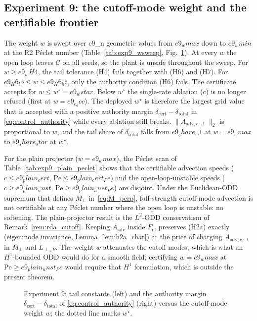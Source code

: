

\subsection{Experiment 9: the cutoff-mode weight and the certifiable frontier}
The weight \(w\) is swept over {{e9_n}} geometric values from \({{e9_wmax}}\) down to \({{e9_wmin}}\) at the R2 P\'eclet number
(Table~\ref{tab:exp9_wsweep}, Fig.~\ref{fig:exp9}). At every \(w\) the open loop leaves \(\mathcal C\) on all seeds, so
the plant is unsafe throughout the sweep. For \(w \ge {{e9_wH4}}\), the tail tolerance (H4) fails together with (H6) and
(H7). For \({{e9_H6_lo}} \le w \le {{e9_H6_hi}}\), only the authority condition (H6) fails. The certificate accepts
for \(w \le w^\star = {{e9_wstar}}\). Below \(w^\star\) the single-rate ablation (c) is no longer refused (first at
\(w = {{e9_c_acc}}\)). The deployed \(w^\star\) is therefore the largest grid value that is accepted with a positive
authority margin \(\delta_{\mathrm{cert}}-\delta_{\mathrm{total}}\) in \eqref{eq:control_authority} while every ablation still breaks. \(\|A_{\mathrm{adv},r,\perp}\|_2\) is proportional to
\(w\), and the tail share of \(\delta_{\mathrm{total}}\) falls from \({{e9_share_w1}}\) at \(w = {{e9_wmax}}\) to
\({{e9_share_star}}\) at \(w^\star\).

For the plain projector (\(w = {{e9_wmax}}\)), the P\'eclet scan of Table~\ref{tab:exp9_plain_peclet} shows that the certifiable
advection speeds (\(c \le {{e9_plain_cert}}\), \(\mathrm{Pe} \le {{e9_plain_cert_Pe}}\)) and the open-loop-unstable speeds
(\(c \ge {{e9_plain_unst}}\), \(\mathrm{Pe} \ge {{e9_plain_unst_Pe}}\)) are disjoint. Under the Euclidean-ODD supremum that
defines \(M_\perp\) in~\eqref{eq:M_perp}, full-strength cutoff-mode advection is not certifiable at any P\'eclet number
where the open loop is unstable: no softening. The plain-projector result is the \(L^2\)-ODD conservatism of
Remark~\ref{rem:rda_cutoff}. Keeping \(A_{\mathrm{adv}}\) inside \(F_{\mathrm{nl}}\) preserves (H2a) exactly (eigenmode
invariance, Lemma~\ref{lem:h2a_char}) at the price of charging \(A_{\mathrm{adv},r,\perp}\) in \(M_\perp\) and
\(L_{\perp,P}\). The weight \(w\) attenuates the cutoff modes, which is what an \(H^1\)-bounded ODD would do for a smooth
field; certifying \(w = {{e9_wmax}}\) at \(\mathrm{Pe} \ge {{e9_plain_unst_Pe}}\) would require that \(H^1\) formulation,
which is outside the present theorem.



\begin{figure}[t]\centering{}
\caption{Experiment 9: tail constants (left) and the authority margin \(\delta_{\mathrm{cert}}-\delta_{\mathrm{total}}\) of \eqref{eq:control_authority} (right)
versus the cutoff-mode weight \(w\); the dotted line marks \(w^\star\).}\label{fig:exp9}\end{figure}

